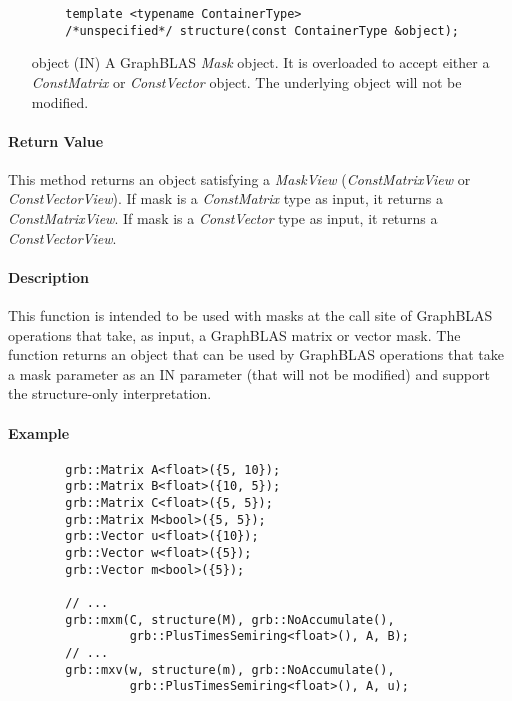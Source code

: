 \begin{verbatim}
        template <typename ContainerType>
        /*unspecified*/ structure(const ContainerType &object);
\end{verbatim}

\begin{itemize}%
    \item[{\sf object}] ({\sf IN}) A GraphBLAS \emph{Mask} object. It is 
    overloaded to accept either a \emph{ConstMatrix} or \emph{ConstVector} 
    object.  The underlying object will not be modified.
\end{itemize}

\paragraph{Return Value}

This method returns an object satisfying a \emph{MaskView} (\emph{ConstMatrixView} or 
\emph{ConstVectorView}). If {\sf mask} is a \emph{ConstMatrix} type as input, 
it returns a \emph{ConstMatrixView}.  If {\sf mask} is a \emph{ConstVector} 
type as input, it returns a \emph{ConstVectorView}.  

\paragraph{Description}

This function is intended to be used with masks at the call site of GraphBLAS 
operations that take, as input, a GraphBLAS matrix or vector mask.  The function 
returns an object that can be used by GraphBLAS operations that take a mask 
parameter as an {\sf IN} parameter (that will not be modified) and support the 
structure-only interpretation.

\paragraph{Example}

\begin{verbatim}
        grb::Matrix A<float>({5, 10});
        grb::Matrix B<float>({10, 5});
        grb::Matrix C<float>({5, 5});
        grb::Matrix M<bool>({5, 5});
        grb::Vector u<float>({10});
        grb::Vector w<float>({5});
        grb::Vector m<bool>({5});
        
        // ...
        grb::mxm(C, structure(M), grb::NoAccumulate(), 
                 grb::PlusTimesSemiring<float>(), A, B);
        // ...
        grb::mxv(w, structure(m), grb::NoAccumulate(), 
                 grb::PlusTimesSemiring<float>(), A, u);
\end{verbatim}


